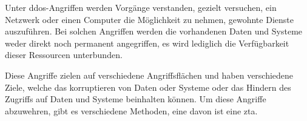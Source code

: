 \begin{definition}
    \label{def:ddos}
    Unter \gls{ddos}-Angriffen werden Vorgänge verstanden, gezielt versuchen, ein Netzwerk oder einen Computer die Möglichkeit zu nehmen, gewohnte Dienste auszuführen.
    Bei solchen Angriffen werden die vorhandenen Daten und Systeme weder direkt noch permanent angegriffen, es wird lediglich die Verfügbarkeit dieser Ressourcen unterbunden.\autocite[\vglf][]{ddos-definition-2003}
\end{definition}

Diese Angriffe zielen auf verschiedene Angriffsflächen und haben verschiedene Ziele, welche das korruptieren von Daten oder Systeme oder das Hindern des Zugriffs auf Daten und Systeme beinhalten können.
Um diese Angriffe abzuwehren, gibt es verschiedene Methoden, eine davon ist eine \gls{zta}.

